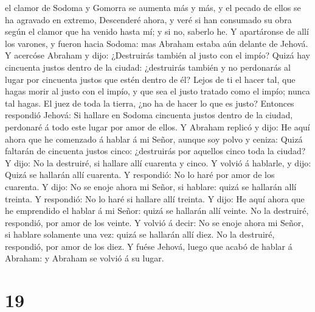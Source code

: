 el clamor de Sodoma y Gomorra se aumenta más y más, y el pecado de ellos
se ha agravado en extremo,  Descenderé ahora, y veré si han
consumado su obra según el clamor que ha venido hasta mí; y si no,
saberlo he.  Y apartáronse de allí los varones, y fueron
hacia Sodoma: mas Abraham estaba aún delante de Jehová.  Y
acercóse Abraham y dijo: ¿Destruirás también al justo con el impío?
 Quizá hay cincuenta justos dentro de la ciudad:
¿destruirás también y no perdonarás al lugar por cincuenta justos que
estén dentro de él?  Lejos de ti el hacer tal, que hagas
morir al justo con el impío, y que sea el justo tratado como el impío;
nunca tal hagas. El juez de toda la tierra, ¿no ha de hacer lo que es
justo?  Entonces respondió Jehová: Si hallare en Sodoma
cincuenta justos dentro de la ciudad, perdonaré á todo este lugar por
amor de ellos.  Y Abraham replicó y dijo: He aquí ahora que
he comenzado á hablar á mi Señor, aunque soy polvo y ceniza:
 Quizá faltarán de cincuenta justos cinco: ¿destruirás por
aquellos cinco toda la ciudad? Y dijo: No la destruiré, si hallare allí
cuarenta y cinco.  Y volvió á hablarle, y dijo: Quizá se
hallarán allí cuarenta. Y respondió: No lo haré por amor de los
cuarenta.  Y dijo: No se enoje ahora mi Señor, si hablare:
quizá se hallarán allí treinta. Y respondió: No lo haré si hallare allí
treinta.  Y dijo: He aquí ahora que he emprendido el hablar
á mi Señor: quizá se hallarán allí veinte. No la destruiré, respondió,
por amor de los veinte.  Y volvió á decir: No se enoje
ahora mi Señor, si hablare solamente una vez: quizá se hallarán allí
diez. No la destruiré, respondió, por amor de los diez.  Y
fuése Jehová, luego que acabó de hablar á Abraham: y Abraham se volvió á
su lugar.

\hypertarget{section-18}{%
\section{19}\label{section-18}}

